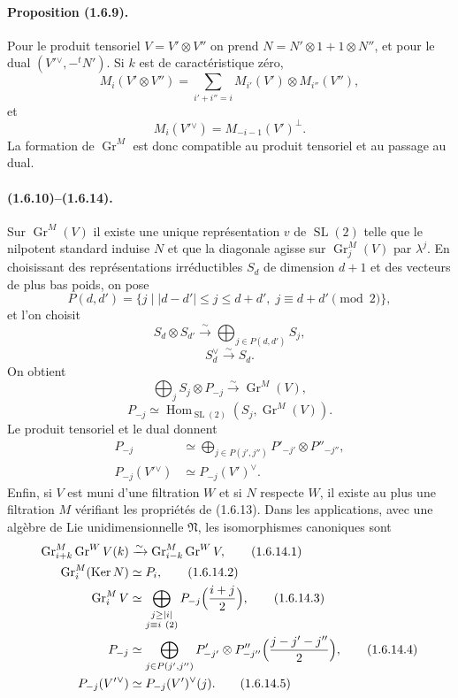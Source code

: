 \documentclass[11pt]{article}
\theoremstyle{remark}
\newcommand{\Hom}{\operatorname{Hom}}
\newcommand{\Gr}{\operatorname{Gr}}
\newcommand{\Ker}{\operatorname{Ker}}
\begin{document}
\paragraph{Proposition (1.6.9).}
Pour le produit tensoriel $V=V'\otimes V''$ on prend $N=N'\otimes1+1\otimes N''$, et pour le dual $(V'{}^\vee,-{}^tN')$. Si $k$ est de caractéristique zéro,
\[
M_i(V'\otimes V'')=\sum_{i'+i''=i}M_{i'}(V')\otimes M_{i''}(V''),
\]
et
\[
M_i(V'{}^\vee)=M_{-i-1}(V')^\perp.
\]
La formation de $\Gr^M$ est donc compatible au produit tensoriel et au passage au dual.

\paragraph{(1.6.10)--(1.6.14).}
Sur $\Gr^M(V)$ il existe une unique représentation $v$ de $\operatorname{SL}(2)$ telle que le nilpotent standard induise $N$ et que la diagonale agisse sur $\Gr^M_j(V)$ par $\lambda^j$. En choisissant des représentations irréductibles $S_d$ de dimension $d+1$ et des vecteurs de plus bas poids, on pose
\begin{equation}\tag{1.6.11.1}
P(d,d')=\{j\mid |d-d'|\le j\le d+d',\; j\equiv d+d'\pmod 2\},
\end{equation}
et l'on choisit
\begin{equation}\tag{1.6.11.2}
S_d\otimes S_{d'}\xrightarrow{\sim}\bigoplus_{j\in P(d,d')}S_j,
\end{equation}
\begin{equation}\tag{1.6.11.3}
S_d^\vee\xrightarrow{\sim}S_d.
\end{equation}
On obtient
\begin{equation}\tag{1.6.11.4}
\bigoplus_j S_j\otimes P_{-j}\xrightarrow{\sim}\Gr^M(V),
\end{equation}
\begin{equation}\tag{1.6.11.5}
P_{-j}\simeq\Hom_{\operatorname{SL}(2)}(S_j,\Gr^M(V)).
\end{equation}
Le produit tensoriel et le dual donnent
\begin{align}
P_{-j}&\simeq\bigoplus_{j\in P(j',j'')}P'_{-j'}\otimes P''_{-j''}, \tag{1.6.12.1}\\
P_{-j}(V'{}^\vee)&\simeq P_{-j}(V')^\vee. \tag{1.6.12.2}
\end{align}
Enfin, si $V$ est muni d'une filtration $W$ et si $N$ respecte $W$, il existe au plus une filtration $M$ vérifiant les propriétés de (1.6.13). Dans les applications, avec une algèbre de Lie unidimensionnelle $\mathfrak N$, les isomorphismes canoniques sont
\begin{align}
\Gr^M_{i+k}\Gr^WV(k)&\xrightarrow{\sim}\Gr^M_{i-k}\Gr^WV, \tag{1.6.14.1}\\
\Gr^M_i(\Ker N)&\simeq P_i, \tag{1.6.14.2}\\
\Gr^M_iV&\simeq\bigoplus_{\substack{j\ge |i|\\ j\equiv i\ (2)}}P_{-j}\Bigl(\frac{i+j}{2}\Bigr), \tag{1.6.14.3}\\
P_{-j}&\simeq\bigoplus_{j\in P(j',j'')}P'_{-j'}\otimes P''_{-j''}\Bigl(\frac{j-j'-j''}{2}\Bigr), \tag{1.6.14.4}\\
P_{-j}(V'{}^\vee)&\simeq P_{-j}(V')^\vee(j). \tag{1.6.14.5}
\end{align}
\end{document}

